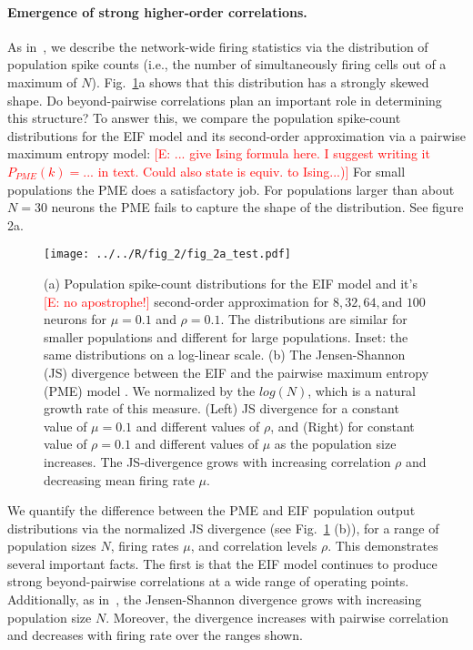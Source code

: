 \documentclass[%
 reprint,
 amsmath,amssymb,
 aps,
floatfix,
]{revtex4-1}
\newcommand{\Ecomment}[1]{\textcolor{red}{[E: #1]}}
\begin{document}
\paragraph*{Emergence of strong higher-order correlations.}  As in~\cite{Macke,Barreiro,Panzeri,Amarietal03}, we describe the network-wide firing statistics via the distribution of population spike counts (i.e., the number of simultaneously firing cells out of a maximum of $N$).  Fig.~\ref{fig:eifising}a shows that this distribution has a strongly skewed shape.  Do beyond-pairwise correlations plan an important role in determining this structure?  To answer this, we compare the population spike-count distributions for the EIF model and its second-order approximation via a pairwise maximum entropy model: \Ecomment{... give Ising formula here.  I suggest writing it $P_{PME}(k)=...$ in text.  Could also state is equiv. to Ising...)}  For small populations the PME does a satisfactory job. For populations larger than about $N=30$ neurons the PME fails to capture the shape of the distribution. 
See figure 2a.


\begin{figure}[h]
\texttt{[image: ../../R/fig\_2/fig\_2a\_test.pdf]}
\caption{\label{fig:eifising} %
(a) Population spike-count distributions for the EIF model and it's \Ecomment{no apostrophe!} second-order approximation for $8, 32, 64, \text{and } 100$ neurons for $\mu = 0.1$ and $\rho = 0.1$. The distributions are similar for smaller populations and different for large populations. Inset: the same distributions on a log-linear scale. (b) The Jensen-Shannon (JS) divergence between the EIF and the pairwise maximum entropy (PME) model .  We normalized by the $log(N)$, which is a natural growth rate of this measure. (Left) JS divergence for a constant value of $\mu = 0.1$ and different values of $\rho$, and (Right) for constant value of $\rho = 0.1$ and different values of $\mu$ as the population size increases. The JS-divergence grows with increasing correlation $\rho$ and decreasing mean firing rate $\mu$.}
\end{figure}

We quantify the difference between the PME and EIF population output distributions via the normalized JS divergence (see Fig.~\ref{fig:eifising} (b)), for a range of population sizes $N$, firing rates $\mu$, and correlation levels $\rho$.  This demonstrates several important facts.  The first is that the EIF model continues to produce strong beyond-pairwise correlations at a wide range of operating points.  Additionally, as in~\cite{Macke, cf. Roudi}, the Jensen-Shannon divergence grows with increasing population size $N$.  Moreover, the divergence increases with pairwise correlation and decreases with firing rate over the ranges shown.
\end{document}
